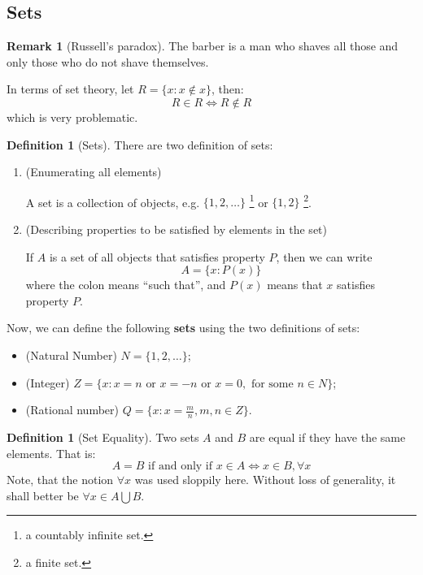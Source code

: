 \documentclass[12pt]{article}
\theoremstyle{definition}
\newtheorem{definition}[theorem]{Definition}
\newtheorem{remark}[theorem]{Remark}
\theoremstyle{plain}
\begin{document}
\subsection{Sets}
\begin{remark}[Russell's paradox]
    The barber is a man who shaves all those and only those who do not shave 
    themselves.

    In terms of set theory, let $R = \{ x : x \not \in x\}$, then:
    \[
        R \in R \iff R \not \in R
    \]
    which is very problematic.
\end{remark}

\begin{definition}[Sets]
    There are two definition of sets: 
    \begin{enumerate}
        \item (Enumerating all elements)

            A set is a collection of objects, e.g. $\{1,2,\ldots\}$ \footnote{a countably 
            infinite set.} or $\{1,2\}$ \footnote{a finite set.}.
        \item (Describing properties to be satisfied by elements in the set)

            If $A$ is a set of all objects that satisfies property $P$, then we 
            can write 
            \[
                A = \{ x : P(x)\}
            \]
            where the colon means ``such that'', and $P(x)$ means that $x$ 
            satisfies property $P$.
    \end{enumerate}
\end{definition}

Now, we can define the following \textbf{sets} using the two definitions of sets:
\begin{itemize}
    \item (Natural Number) $N = \{ 1, 2, \ldots\}$;
    \item (Integer) $Z = \{ x: x = n \text{ or } x = -n \text{ or } x = 0, 
        \text{ for some } n \in N\}$;
    \item (Rational number) $Q = \{ x : x = \frac{m}{n}, m,n \in Z\}.$
\end{itemize}

\begin{definition}
    [Set Equality]
    Two sets $A$ and $B$ are equal if they have the same elements. That is: 
    \[
        A = B \text{ if and only if } x \in A \iff x \in B, \forall x
    \]
    Note, that the notion $\forall x$ was used sloppily here. Without loss of 
    generality, it shall better be $\forall x \in A \bigcup B$.
\end{definition}
\end{document}
